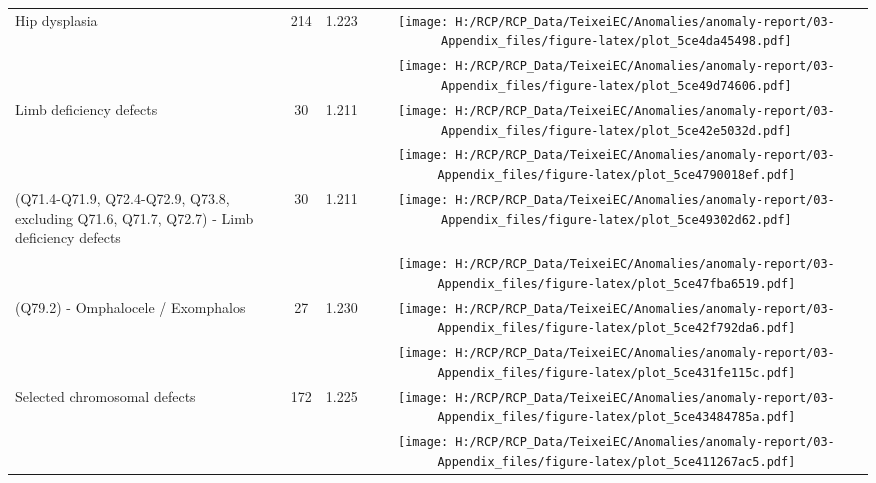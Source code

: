 \documentclass[
]{krantz}
\begin{document}
\begin{longtable}[t]{>{\raggedright\arraybackslash}m{4cm}cc>{}c}
Hip dysplasia & 214 & 1.223 & \texttt{[image: H:/RCP/RCP\_Data/TeixeiEC/Anomalies/anomaly-report/03-Appendix\_files/figure-latex/plot\_5ce4da45498.pdf]}\\
\addlinespace
\cellcolor{gray!6}{(Q65) - Hip dysplasia} & \cellcolor{gray!6}{214} & \cellcolor{gray!6}{1.223} & \cellcolor{gray!6}{}\texttt{[image: H:/RCP/RCP\_Data/TeixeiEC/Anomalies/anomaly-report/03-Appendix\_files/figure-latex/plot\_5ce49d74606.pdf]}\\
Limb deficiency defects & 30 & 1.211 & \texttt{[image: H:/RCP/RCP\_Data/TeixeiEC/Anomalies/anomaly-report/03-Appendix\_files/figure-latex/plot\_5ce42e5032d.pdf]}\\
\cellcolor{gray!6}{(Q79.0) - Diaphragmatic hernia} & \cellcolor{gray!6}{28} & \cellcolor{gray!6}{1.239} & \cellcolor{gray!6}{}\texttt{[image: H:/RCP/RCP\_Data/TeixeiEC/Anomalies/anomaly-report/03-Appendix\_files/figure-latex/plot\_5ce4790018ef.pdf]}\\
(Q71.4-Q71.9, Q72.4-Q72.9, Q73.8, excluding Q71.6, Q71.7, Q72.7) - Limb deficiency defects & 30 & 1.211 & \texttt{[image: H:/RCP/RCP\_Data/TeixeiEC/Anomalies/anomaly-report/03-Appendix\_files/figure-latex/plot\_5ce49302d62.pdf]}\\
\cellcolor{gray!6}{Selected abdominal wall defects} & \cellcolor{gray!6}{88} & \cellcolor{gray!6}{1.231} & \cellcolor{gray!6}{}\texttt{[image: H:/RCP/RCP\_Data/TeixeiEC/Anomalies/anomaly-report/03-Appendix\_files/figure-latex/plot\_5ce47fba6519.pdf]}\\
\addlinespace
(Q79.2) - Omphalocele / Exomphalos & 27 & 1.230 & \texttt{[image: H:/RCP/RCP\_Data/TeixeiEC/Anomalies/anomaly-report/03-Appendix\_files/figure-latex/plot\_5ce42f792da6.pdf]}\\
\cellcolor{gray!6}{(Q79.3) - Gastroschisis} & \cellcolor{gray!6}{34} & \cellcolor{gray!6}{1.225} & \cellcolor{gray!6}{}\texttt{[image: H:/RCP/RCP\_Data/TeixeiEC/Anomalies/anomaly-report/03-Appendix\_files/figure-latex/plot\_5ce431fe115c.pdf]}\\
Selected chromosomal defects & 172 & 1.225 & \texttt{[image: H:/RCP/RCP\_Data/TeixeiEC/Anomalies/anomaly-report/03-Appendix\_files/figure-latex/plot\_5ce43484785a.pdf]}\\
\cellcolor{gray!6}{(Q90) - Down Syndrome} & \cellcolor{gray!6}{121} & \cellcolor{gray!6}{1.225} & \cellcolor{gray!6}{}\texttt{[image: H:/RCP/RCP\_Data/TeixeiEC/Anomalies/anomaly-report/03-Appendix\_files/figure-latex/plot\_5ce411267ac5.pdf]}\\

\end{longtable}
\end{document}

